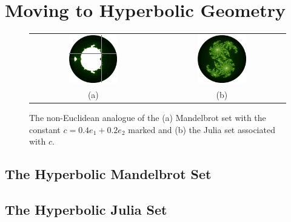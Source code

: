 \section{Moving to Hyperbolic Geometry}

\begin{figure}
\centering
\begin{tabular}{c@{$\quad$}c}
\includegraphics[width=0.4\textwidth]{hyp_mandel_julia_pos} 
 & \includegraphics[width=0.4\textwidth]{julia_hyp} \\
                          (a) & (b)
\end{tabular}
\caption{\label{fig:noneuclidean_sets}The non-Euclidean analogue of the (a) Mandelbrot set with
  the constant $c = 0.4e_1 + 0.2e_2$ marked and (b) the Julia
  set associated with $c$.}
\end{figure}

\subsection{The Hyperbolic Mandelbrot Set}

\subsection{The Hyperbolic Julia Set}
